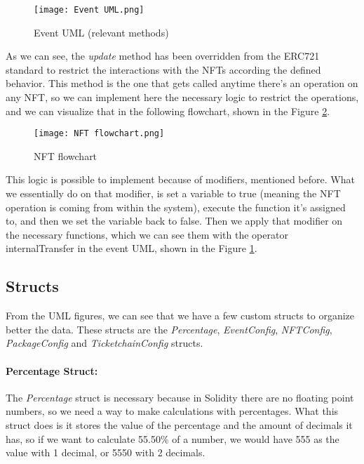 \begin{figure}[H]
	\texttt{[image: Event UML.png]}
	\centering
	\caption{Event UML (relevant methods)}
	\label{fig:event_uml}
\end{figure}

As we can see, the \textit{update} method has been overridden from the ERC721
standard to restrict the interactions with the NFTs according the defined
behavior. This method is the one that gets called anytime there's an operation
on any NFT, so we can implement here the necessary logic to restrict the
operations, and we can visualize that in the following flowchart, shown in the
Figure \ref{fig:nft_flowchart}.

\begin{figure}[H]
	\texttt{[image: NFT flowchart.png]}
	\centering
	\caption{NFT flowchart}
	\label{fig:nft_flowchart}
\end{figure}

This logic is possible to implement because of modifiers, mentioned before.
What we essentially do on that modifier, is set a variable to true (meaning the
NFT operation is coming from within the system), execute the function it's
assigned to, and then we set the variable back to false. Then we apply that
modifier on the necessary functions, which we can see them with the operator
	{internalTransfer} in the event UML, shown in the Figure \ref{fig:event_uml}.

\subsection{Structs}
\label{subsec:structs}

From the UML figures, we can see that we have a few custom structs to organize
better the data. These structs are the \textit{Percentage},
\textit{EventConfig}, \textit{NFTConfig}, \textit{PackageConfig} and
\textit{TicketchainConfig} structs.

\paragraph{Percentage Struct:} The \textit{Percentage} struct is necessary because in Solidity there are no
floating point numbers, so we need a way to make calculations with percentages.
What this struct does is it stores the value of the percentage and the amount
of decimals it has, so if we want to calculate 55.50\% of a number, we would
have 555 as the value with 1 decimal, or 5550 with 2 decimals.

